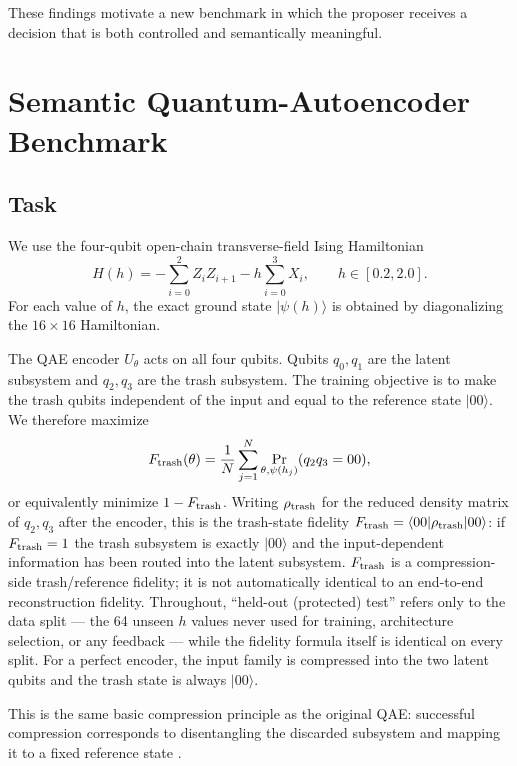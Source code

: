 \documentclass[11pt]{article}
\begin{document}
These findings motivate a new benchmark in which the proposer receives a decision that is both controlled and semantically meaningful.

\section{Semantic Quantum-Autoencoder Benchmark}

\subsection{Task}

We use the four-qubit open-chain transverse-field Ising Hamiltonian
\begin{equation}
H(h) = -\sum_{i=0}^{2} Z_i Z_{i+1} - h\sum_{i=0}^{3} X_i,\qquad h\in[0.2,2.0].
\end{equation}
For each value of $h$, the exact ground state $\lvert\psi(h)\rangle$ is obtained by diagonalizing the $16\times16$ Hamiltonian.

The QAE encoder $U_\theta$ acts on all four qubits.
Qubits $q_0,q_1$ are the latent subsystem and $q_2,q_3$ are the trash subsystem.
The training objective is to make the trash qubits independent of the input and equal to the reference state $\lvert 00\rangle$.
We therefore maximize
\begin{equation}
F_{\rm trash}(\theta)
=
\frac{1}{N}\sum_{j=1}^{N}
\Pr_{\theta,\psi(h_j)}(q_2q_3=00),
\end{equation}
or equivalently minimize $1-F_{\rm trash}$.
Writing $\rho_{\rm trash}$ for the reduced density matrix of $q_2,q_3$ after the encoder, this is the trash-state fidelity $F_{\rm trash}=\langle 00|\rho_{\rm trash}|00\rangle$: if $F_{\rm trash}=1$ the trash subsystem is exactly $\lvert00\rangle$ and the input-dependent information has been routed into the latent subsystem.
$F_{\rm trash}$ is a compression-side trash/reference fidelity; it is not automatically identical to an end-to-end reconstruction fidelity.
Throughout, ``held-out (protected) test'' refers only to the data split --- the 64 unseen $h$ values never used for training, architecture selection, or any feedback --- while the fidelity formula itself is identical on every split.
For a perfect encoder, the input family is compressed into the two latent qubits and the trash state is always $\lvert00\rangle$.

This is the same basic compression principle as the original QAE: successful compression corresponds to disentangling the discarded subsystem and mapping it to a fixed reference state \cite{romero2017}.
\end{document}

